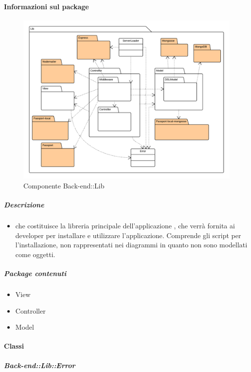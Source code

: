   \paragraph{Informazioni sul package} 
    \begin{figure}[H] 
      \begin{center} 
        \includegraphics[width=\textwidth]{packages/Back-end::Lib.png}  
        \caption{Componente Back-end::Lib}
      \end{center}  
    \end{figure} 
  \subparagraph{Descrizione} 
    \begin{itemize}
    \item[]  che costituisce la libreria principale dell’applicazione , che verrà fornita ai
developer per installare e utilizzare l’applicazione. Comprende gli script per l’installazione,
non rappresentati nei diagrammi in quanto non sono modellati come oggetti.

    \end{itemize} 
    \subparagraph{Package contenuti} 
    \begin{itemize}
        \item View
        \item Controller
        \item Model
    \end{itemize}
    \paragraph{Classi}
      \subparagraph{Back-end::Lib::Error}
        
